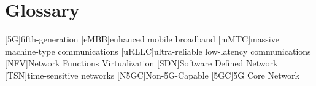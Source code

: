 \chapter{Glossary}

\footnotesize
\SingleSpacing

\begin{multicols}{2}
\begin{acronym}[AAAAAA]

	[5G]{fifth-generation}
	[eMBB]{enhanced mobile broadband}
	[mMTC]{massive machine-type communications}
	[uRLLC]{ultra-reliable low-latency communications}
	[NFV]{Network Functions Virtualization}
	[SDN]{Software Defined Network}
	[TSN]{time-sensitive networks}
	[N5GC]{Non-5G-Capable}
	[5GC]{5G Core Network}

\end{acronym}
\end{multicols}

